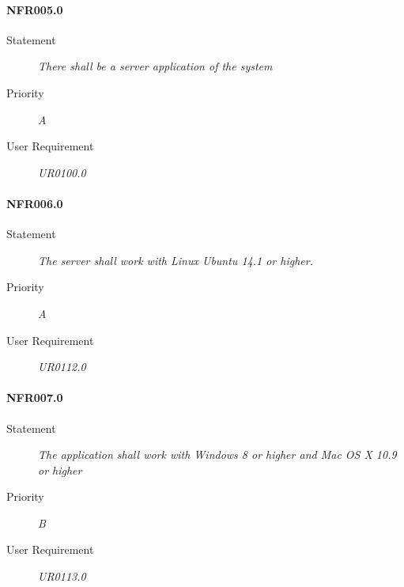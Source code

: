 \paragraph{NFR005.0}
\begin{description}
\item[Statement] \textit{
There shall be a server application of the system 
}
\item[Priority] \textit{A}
\item[User Requirement] \textit{UR0100.0}
\end{description}

\paragraph{NFR006.0}
\begin{description}
\item[Statement] \textit{
The server shall work with Linux Ubuntu 14.1 or higher.
}
\item[Priority] \textit{A}
\item[User Requirement] \textit{UR0112.0}
\end{description}

\paragraph{NFR007.0}
\begin{description}
\item[Statement] \textit{
The application shall work with Windows 8 or higher and Mac OS X 10.9 or higher
}
\item[Priority] \textit{B}
\item[User Requirement] \textit{UR0113.0}
\end{description}